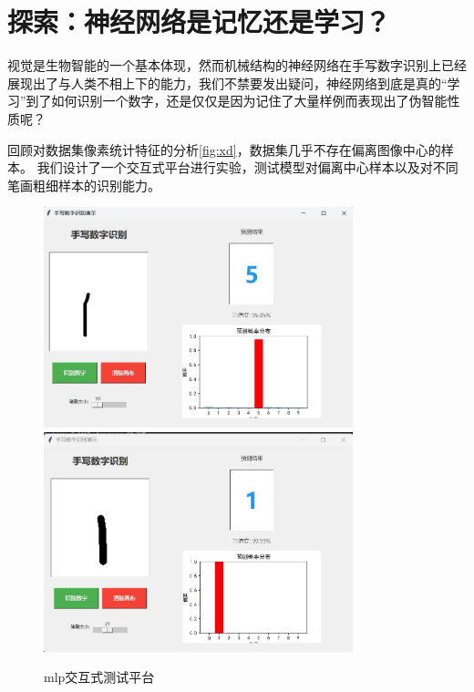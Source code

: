 \documentclass[12pt,a4paper]{article}
\begin{document}
\section{探索：神经网络是记忆还是学习？}
视觉是生物智能的一个基本体现，然而机械结构的神经网络在手写数字识别上已经展现出了与人类不相上下的能力，我们不禁要发出疑问，神经网络到底是真的“学习”到了如何识别一个数字，还是仅仅是因为记住了大量样例而表现出了伪智能性质呢？

回顾对数据集像素统计特征的分析\ref{fig:xd}，数据集几乎不存在偏离图像中心的样本。
我们设计了一个交互式平台进行实验，测试模型对偏离中心样本以及对不同笔画粗细样本的识别能力。
\begin{figure}[H]
    \centering
    \includegraphics[width=0.8\textwidth]{../images/mlp/2025-06-21 063508.jpg}
    \includegraphics[width=0.8\textwidth]{../images/mlp/2025-06-21 063540.jpg}
    \caption{mlp交互式测试平台}
    \label{fig:interactive}
\end{figure}
\end{document}
